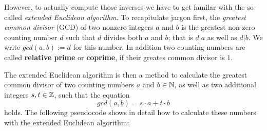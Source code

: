However, to actually compute those inverses we have to get familar with the so-called \textit{extended Euclidean algorithm}. To recapitulate jargon first, the \textit{greatest common divisor} (GCD) of two nonzero integers $a$ and $b$ is the greatest non-zero counting number $d$ such that $d$ divides both $a$ and $b$; that is $d|a$ as well as $d|b$. We write $ gcd (a, b):=d $ for this number. In addition two counting numbers are called \textbf{relative prime} or \textbf{coprime}, if their greates common divisor is $1$.

The extended Euclidean algorithm is then a method to calculate the greatest common divisor of two counting numbers $ a $ and $ b \in \mathbb{N} $, as well as two additional integers $ s, t \in \mathbb{Z} $, such that the equation
\begin{equation}
\label{eq: erw_Eukl_algo}
gcd (a, b) = s \cdot a + t \cdot b
\end{equation}
holds. The following pseudocode shows in detail how to calculate these numbers with the extended Euclidean algorithm:

